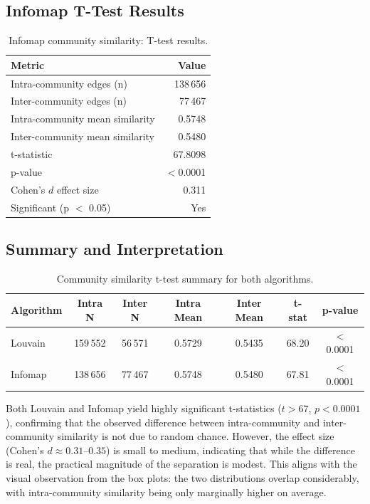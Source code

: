 \documentclass[12pt,a4paper]{article}
\begin{document}
\subsection{Infomap T-Test Results}

\begin{table}[H]
\centering
\caption{Infomap community similarity: T-test results.}
\label{tab:infomap_ttest}
\begin{tabular}{lr}
\toprule
\textbf{Metric} & \textbf{Value} \\
\midrule
Intra-community edges (n) & 138\,656 \\
Inter-community edges (n) & 77\,467 \\
Intra-community mean similarity & 0.5748 \\
Inter-community mean similarity & 0.5480 \\
t-statistic & 67.8098 \\
p-value & $<$0.0001 \\
Cohen's $d$ effect size & 0.311 \\
Significant (p $<$ 0.05) & Yes \\
\bottomrule
\end{tabular}
\end{table}

\subsection{Summary and Interpretation}

\begin{table}[H]
\centering
\caption{Community similarity t-test summary for both algorithms.}
\label{tab:ttest_summary}
\begin{tabular}{lcccccc}
\toprule
\textbf{Algorithm} & \textbf{Intra N} & \textbf{Inter N} & \textbf{Intra Mean} & \textbf{Inter Mean} & \textbf{t-stat} & \textbf{p-value} \\
\midrule
Louvain & 159\,552 & 56\,571 & 0.5729 & 0.5435 & 68.20 & $<$0.0001 \\
Infomap & 138\,656 & 77\,467 & 0.5748 & 0.5480 & 67.81 & $<$0.0001 \\
\bottomrule
\end{tabular}
\end{table}

Both Louvain and Infomap yield highly significant t-statistics ($t > 67$, $p < 0.0001$),
confirming that the observed difference between intra-community and inter-community
similarity is not due to random chance.  However, the effect size (Cohen's $d \approx 0.31$--$0.35$)
is small to medium, indicating that while the difference is real, the practical
magnitude of the separation is modest.  This aligns with the visual observation
from the box plots: the two distributions overlap considerably, with intra-community
similarity being only marginally higher on average.
\end{document}
